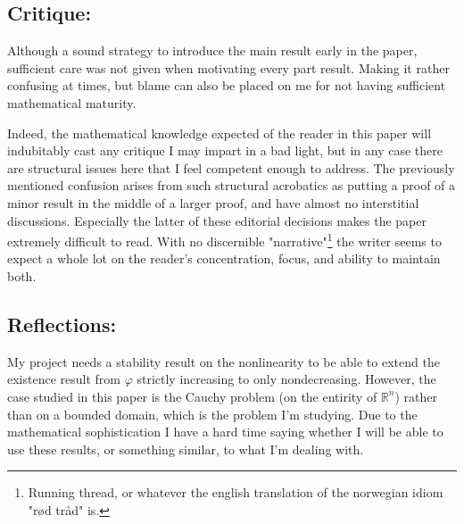 \documentclass[11pt, a4paper]{article}
\begin{document}
\subsection{Critique:}
Although a sound strategy to introduce the main result early in the paper, sufficient care was not given when motivating every part result. Making it rather confusing at times, but blame can also be placed on me for not having sufficient mathematical maturity.

Indeed, the mathematical knowledge expected of the reader in this paper will indubitably cast any critique I may impart in a bad light, but in any case there are structural issues here that I feel competent enough to address. The previously mentioned confusion arises from such structural acrobatics as putting a proof of a minor result in the middle of a larger proof, and have almost no interstitial discussions. Especially the latter of these editorial decisions makes the paper extremely difficult to read. With no discernible "narrative"\footnote{Running thread, or whatever the english translation of the norwegian idiom "rød tråd" is.} the writer seems to expect a whole lot on the reader's concentration, focus, and ability to maintain both.

\subsection{Reflections:}
My project needs a stability result on the nonlinearity to be able to extend the existence result from $\varphi$ strictly increasing to only nondecreasing. However, the case studied in this paper is the Cauchy problem (on the entirity of $\mathbb{R}^n$) rather than on a bounded domain, which is the problem I'm studying. Due to the mathematical sophistication I have a hard time saying whether I will be able to use these results, or something similar, to what I'm dealing with.


 





\newpage


\end{document}
